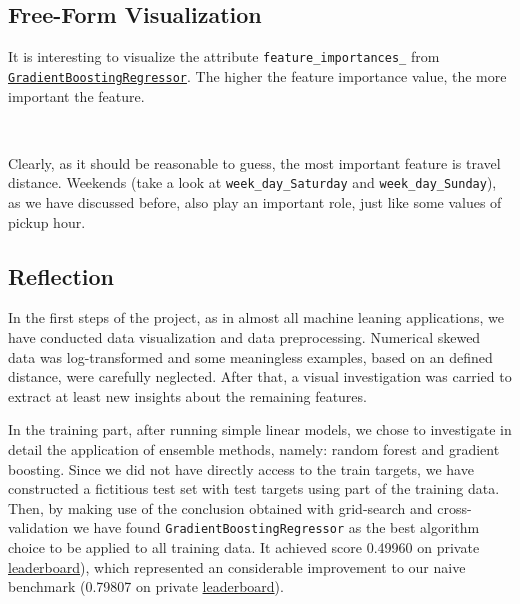 \documentclass[11pt]{article}
\begin{document}
{\subsection{Free-Form Visualization}\label{free-form-visualization}

\hspace{0.5cm} It is interesting to visualize the attribute
\texttt{feature\_importances\_} from
\href{http://scikit-learn.org/stable/modules/generated/sklearn.ensemble.GradientBoostingRegressor.html}{\texttt{GradientBoostingRegressor}}.
The higher the feature importance value, the more important the feature.


    \begin{center}
    \end{center}
    { \hspace*{\fill} \\}
    
    Clearly, as it should be reasonable to guess, the most important feature
is travel distance. Weekends (take a look at
\texttt{week\_day\_Saturday} and \texttt{week\_day\_Sunday}), as we have
discussed before, also play an important role, just like some values of
pickup hour.

    \subsection{Reflection}\label{reflection}

\hspace{0.5cm} In the first steps of the project, as in almost all machine leaning
applications, we have conducted data visualization and data
preprocessing. Numerical skewed data was log-transformed and some
meaningless examples, based on an defined distance, were carefully
neglected. After that, a visual investigation was carried to extract at
least new insights about the remaining features.

In the training part, after running simple linear models, we chose to
investigate in detail the application of ensemble methods, namely:
random forest and gradient boosting. Since we did not have directly
access to the train targets, we have constructed a fictitious test set
with test targets using part of the training data. Then, by making use
of the conclusion obtained with grid-search and cross-validation we have
found \texttt{GradientBoostingRegressor} as the best algorithm choice to
be applied to all training data. It achieved score 0.49960 on private
\href{https://www.kaggle.com/c/nyc-taxi-trip-duration/leaderboard}{leaderboard}),
which represented an considerable improvement to our naive benchmark
(0.79807 on private
\href{https://www.kaggle.com/c/nyc-taxi-trip-duration/leaderboard}{leaderboard}).

}
\end{document}
